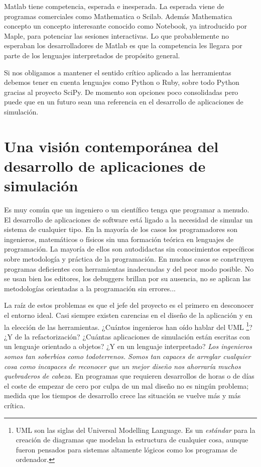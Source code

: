 Matlab tiene competencia, esperada e inesperada. La esperada viene de
programas comerciales como Mathematica o Scilab. Además Mathematica
concepto un concepto interesante conocido como Notebook, ya
introducido por Maple, para potenciar las sesiones interactivas. Lo
que probablemente no esperaban los desarrolladores de Matlab es que la
competencia les llegara por parte de los lenguajes interpretados de
propósito general.

Si nos obligamos a mantener el sentido crítico aplicado a las
herramientas debemos tener en cuenta lenguajes como Python o Ruby,
sobre todo Python gracias al proyecto SciPy. De momento son opciones
poco consolidadas pero puede que en un futuro sean una referencia en
el desarrollo de aplicaciones de simulación.

\section{Una visión contemporánea del desarrollo de aplicaciones de
simulación}

Es muy común que un ingeniero o un científico tenga que programar a
menudo. El desarrollo de aplicaciones de software está ligado a la
necesidad de simular un sistema de cualquier tipo. En la mayoría de
los casos los programadores son ingenieros, matemáticos o físicos sin
una formación teórica en lenguajes de programación. La mayoría de
ellos son autodidactas sin conocimientos específicos sobre metodología
y práctica de la programación. En muchos casos se construyen programas
deficientes con herramientas inadecuadas y del peor modo posible.  No
se usan bien los editores, los debuggers brillan por su ausencia, no
se aplican las metodologías orientadas a la programación sin errores...

La raíz de estos problemas es que el jefe del proyecto es el primero
en desconocer el entorno ideal. Casi siempre existen carencias en el
diseño de la aplicación y en la elección de las herramientas. ¿Cuántos
ingenieros han oído hablar del UML%
\footnote{UML son las siglas del Universal Modelling Language. Es un
  \emph{estándar} para la creación de diagramas que modelan la
  estructura de cualquier cosa, aunque fueron pensados para sistemas
  altamente lógicos como los programas de ordenador.%
}? ¿Y de la refactorización? ¿Cuántas aplicaciones de simulación están
escritas con un lenguaje orientado a objetos? ¿Y en un lenguaje
interpretado?  \emph{Los ingenieros somos tan soberbios como
  todoterrenos. Somos tan capaces de arreglar cualquier cosa como
  incapaces de reconocer que un mejor diseño nos ahorraría muchos
  quebraderos de cabeza}. En programas que requieren desarrollos de
horas o de días el coste de empezar de cero por culpa de un mal diseño
no es ningún problema; medida que los tiempos de desarrollo crece las
situación se vuelve más y más crítica.


